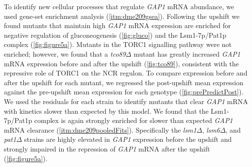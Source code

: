 


To identify new cellular processes that regulate \textit{GAP1} mRNA abundance, we
used gene-set enrichment analysis (\autoref{itm:dme209gsea}).
Following the upshift we found mutants that
maintain high \textit{GAP1} mRNA expression are enriched for negative
regulation of gluconeogenesis (\autoref{fig:gluco}) and the
Lsm1-7p/Pat1p complex (\autoref{fig:figure5a}). Mutants in the TORC1 signalling
pathway were not enriched; 
however, we found that a \textit{tco89}$\Delta$ mutant has
greatly increased \textit{GAP1} mRNA expression before and after the upshift
(\autoref{fig:tco89}), consistent with the repressive role of TORC1
on the NCR regulon.
To compare expression before and after the upshift for each mutant,
we regressed the post-upshift mean expression against the pre-upshift 
mean expression for each genotype (\autoref{fig:prePredictPost}). 
We used the residuals for each
strain to identify mutants that clear \textit{GAP1} mRNA with kinetics slower
than expected by this model.
We found that the Lsm1-7p/Pat1p complex is again strongly 
enriched for slower than
expected \textit{GAP1} mRNA clearance (\autoref{itm:dme209pooledFits}). 
Specifically
the \textit{lsm1}$\Delta$, \textit{lsm6}$\Delta$, and 
\textit{pat1}$\Delta$ strains are highly elevated in \textit{GAP1}
expression before the upshift and strongly impaired in the 
repression of \textit{GAP1} mRNA after the upshift
(\autoref{fig:figure5a}). 

